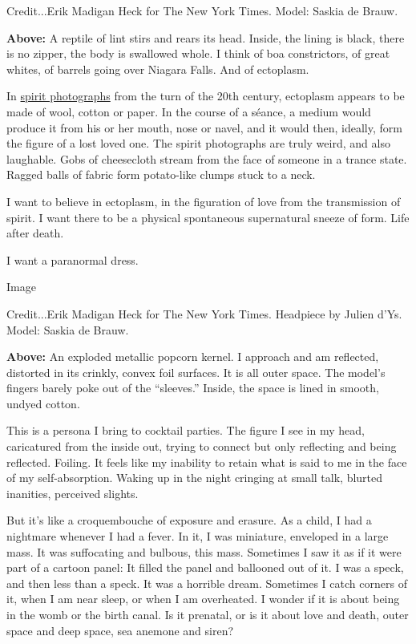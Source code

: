Credit...Erik Madigan Heck for The New York Times. Model: Saskia de
Brauw.

\textbf{Above:} A reptile of lint stirs and rears its head. Inside, the
lining is black, there is no zipper, the body is swallowed whole. I
think of boa constrictors, of great whites, of barrels going over
Niagara Falls. And of ectoplasm.

In
\href{http://www.slate.com/blogs/the_vault/2014/04/09/spirit_photography_craig_and_george_falconer_images_of_ghosts.html}{spirit
photographs} from the turn of the 20th century, ectoplasm appears to be
made of wool, cotton or paper. In the course of a séance, a medium would
produce it from his or her mouth, nose or navel, and it would then,
ideally, form the figure of a lost loved one. The spirit photographs are
truly weird, and also laughable. Gobs of cheesecloth stream from the
face of someone in a trance state. Ragged balls of fabric form
potato-like clumps stuck to a neck.

I want to believe in ectoplasm, in the figuration of love from the
transmission of spirit. I want there to be a physical spontaneous
supernatural sneeze of form. Life after death.

I want a paranormal dress.

Image

Credit...Erik Madigan Heck for The New York Times. Headpiece by Julien
d'Ys. Model: Saskia de Brauw.

\textbf{Above:} An exploded metallic popcorn kernel. I approach and am
reflected, distorted in its crinkly, convex foil surfaces. It is all
outer space. The model's fingers barely poke out of the ``sleeves.''
Inside, the space is lined in smooth, undyed cotton.

This is a persona I bring to cocktail parties. The figure I see in my
head, caricatured from the inside out, trying to connect but only
reflecting and being reflected. Foiling. It feels like my inability to
retain what is said to me in the face of my self-absorption. Waking up
in the night cringing at small talk, blurted inanities, perceived
slights.

But it's like a croquembouche of exposure and erasure. As a child, I had
a nightmare whenever I had a fever. In it, I was miniature, enveloped in
a large mass. It was suffocating and bulbous, this mass. Sometimes I saw
it as if it were part of a cartoon panel: It filled the panel and
ballooned out of it. I was a speck, and then less than a speck. It was a
horrible dream. Sometimes I catch corners of it, when I am near sleep,
or when I am overheated. I wonder if it is about being in the womb or
the birth canal. Is it prenatal, or is it about love and death, outer
space and deep space, sea anemone and siren?

